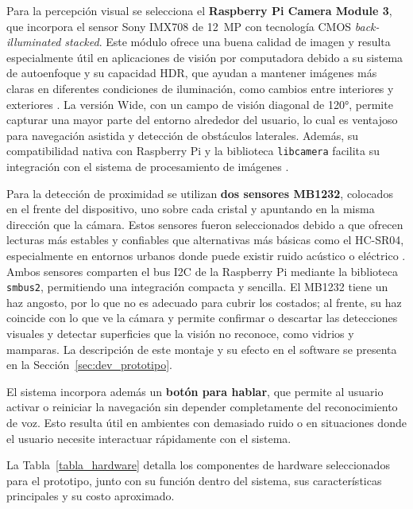 Para la percepción visual se selecciona el \textbf{Raspberry Pi Camera Module 3}, que
incorpora el sensor Sony IMX708 de 12~MP con tecnología CMOS \textit{back-illuminated
stacked}. Este módulo ofrece una buena calidad de imagen y resulta especialmente útil
en aplicaciones de visión por computadora debido a su sistema de autoenfoque y su
capacidad HDR, que ayudan a mantener imágenes más claras en diferentes condiciones
de iluminación, como cambios entre interiores y exteriores
\cite{raspberrypi_camera_doc3}. La versión Wide, con un campo de visión diagonal de
120°, permite capturar una mayor parte del entorno alrededor del usuario, lo cual es
ventajoso para navegación asistida y detección de obstáculos laterales. Además, su
compatibilidad nativa con Raspberry Pi y la biblioteca \texttt{libcamera} facilita
su integración con el sistema de procesamiento de imágenes
\cite{raspberrypi_camera_doc3}.

Para la detección de proximidad se utilizan \textbf{dos sensores MB1232}, colocados
en el frente del dispositivo, uno sobre cada cristal y apuntando en la misma dirección
que la cámara. Estos sensores fueron seleccionados debido
a que ofrecen lecturas más estables y confiables que alternativas más básicas como
el HC-SR04, especialmente en entornos urbanos donde puede existir ruido acústico o
eléctrico \cite{mb1232_datasheet}. Ambos sensores comparten el bus I2C de la
Raspberry Pi mediante la biblioteca \texttt{smbus2}, permitiendo una integración
compacta y sencilla. El MB1232 tiene un haz angosto, por lo que no es adecuado para
cubrir los costados; al frente, su haz coincide con lo que ve la cámara y permite
confirmar o descartar las detecciones visuales y detectar superficies que la visión no
reconoce, como vidrios y mamparas. La descripción de este montaje y su efecto en el
software se presenta en la Sección~\ref{sec:dev_prototipo}.

El sistema incorpora además un \textbf{botón para hablar}, que permite al usuario
activar o reiniciar la navegación sin depender completamente del reconocimiento de
voz. Esto resulta útil en ambientes con demasiado ruido o en situaciones donde el
usuario necesite interactuar rápidamente con el sistema.

La Tabla~\ref{tabla_hardware} detalla los componentes de hardware seleccionados para
el prototipo, junto con su función dentro del sistema, sus características principales
y su costo aproximado.

